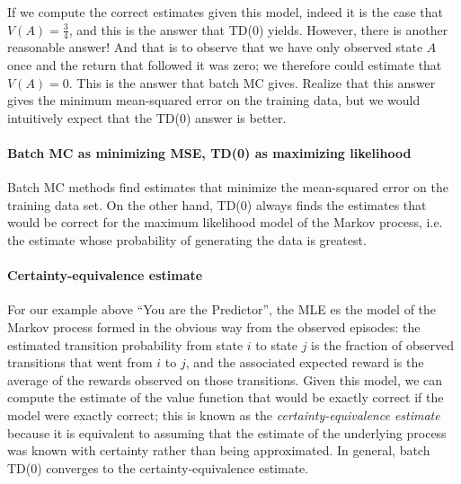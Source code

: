 \documentclass[12pt]{article}
\begin{document}
\begin{figure}[h]
  \centering
\end{figure}

If we compute the correct estimates given this model, indeed it is the case that $V(A) = \frac{3}{4}$, and this is the answer that TD(0) yields. However, there is another reasonable answer! And that is to observe that we have only observed state $A$ once and the return that followed it was zero; we therefore could estimate that $V(A) = 0$. This is the answer that batch MC gives. Realize that this answer gives the minimum mean-squared error on the training data, but we would intuitively expect that the TD(0) answer is better.

\paragraph{Batch MC as minimizing MSE, TD(0) as maximizing likelihood}
Batch MC methods find estimates that minimize the mean-squared error on the training data set. On the other hand, TD(0) always finds the estimates that would be correct for the maximum likelihood model of the Markov process, i.e. the estimate whose probability of generating the data is greatest.

\paragraph{Certainty-equivalence estimate} For our example above ``You are the Predictor'', the MLE es the model of the Markov process formed in the obvious way from the observed episodes: the estimated transition probability from state $i$ to state $j$ is the fraction of observed transitions that went from $i$ to $j$, and the associated expected reward is the average of the rewards observed on those transitions. Given this model, we can compute the estimate of the value function that would be exactly correct if the model were exactly correct; this is known as the \emph{certainty-equivalence estimate} because it is equivalent
to assuming that the estimate of the underlying process was known with certainty rather than being approximated. In general, batch TD(0) converges to the certainty-equivalence estimate.
\end{document}
